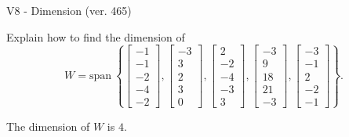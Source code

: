 \begin{exercise}
  \begin{exerciseTitle}V8 - Dimension (ver. 465)\end{exerciseTitle}
  \begin{exerciseStatement}
    Explain how to find the dimension of 
\[W=\mathrm{span}\ \left\{\left[\begin{array}{r}
-1 \\
-1 \\
-2 \\
-4 \\
-2
\end{array}\right] , \left[\begin{array}{r}
-3 \\
3 \\
2 \\
3 \\
0
\end{array}\right] , \left[\begin{array}{r}
2 \\
-2 \\
-4 \\
-3 \\
3
\end{array}\right] , \left[\begin{array}{r}
-3 \\
9 \\
18 \\
21 \\
-3
\end{array}\right] , \left[\begin{array}{r}
-3 \\
-1 \\
2 \\
-2 \\
-1
\end{array}\right]\right\}.\]



  \end{exerciseStatement}
  \begin{exerciseAnswer}
   The dimension of \(W\) is  \(4\).
  


  \end{exerciseAnswer}
\end{exercise}